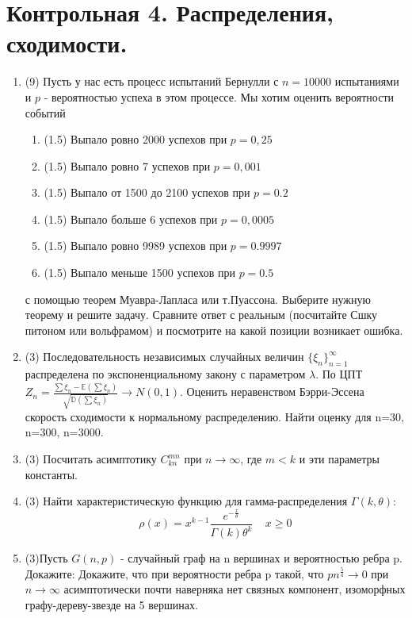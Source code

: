 \documentclass[a4paper, 14pt]{extarticle}
\begin{document}
\section*{Контрольная 4. Распределения, сходимости.} 
\begin{enumerate}

\item (9) Пусть у нас есть процесс испытаний Бернулли с $n = 10000$ испытаниями и $p$ - вероятностью успеха в этом процессе.
Мы хотим оценить вероятности событий 
\begin{enumerate}
\item (1.5) Выпало ровно 2000 успехов при $p=0,25$
\item (1.5) Выпало ровно 7 успехов при $p=0,001$
\item (1.5) Выпало от 1500 до 2100 успехов при $p=0.2$
\item (1.5) Выпало больше 6 успехов при $p=0,0005$
\item (1.5) Выпало ровно 9989 успехов при $p=0.9997$
\item (1.5) Выпало меньше 1500 успехов при $p=0.5$
\end{enumerate}
с помощью теорем Муавра-Лапласа или т.Пуассона. Выберите нужную теорему и решите задачу.
Сравните ответ с реальным (посчитайте Сшку питоном или вольфрамом) и посмотрите на какой позиции возникает ошибка. 

\item (3) Последовательность независимых случайных величин $\{\xi_n\}_{n=1}^{\infty}$ распределена по экспоненциальному закону с параметром $\lambda$. 
По ЦПТ $Z_n = \frac{\sum \xi_n - \mathbb{E}(\sum \xi_n)}{\sqrt{\mathbb{D}(\sum \xi_n)}} \to N(0,1)$. 
Оценить неравенством Бэрри-Эссена скорость сходимости к нормальному распределению. 
Найти оценку для n=30, n=300, n=3000.

\item (3) Посчитать асимптотику $C_{kn}^{mn}$ при $n \to \infty$, где $m<k$ и эти параметры константы.

\item (3) Найти характеристическую функцию для гамма-распределения $\Gamma(k,\theta)$:
$$\rho(x) = x^{k-1}\frac{e^{-\frac{x}{\theta}}}{\Gamma(k)\theta^k}~~~~~x\geq0$$

\item (3)Пусть $G(n,p)$ - случайный граф на n вершинах и вероятностью ребра p. Докажите: 
Докажите, что при вероятности ребра p такой, что $pn^{\frac{5}{4}} \to 0$ при $n \to \infty$ асимптотически почти наверняка нет связных компонент, изоморфных графу-дереву-звезде на 5 вершинах. 


\end{enumerate}
\end{document}
